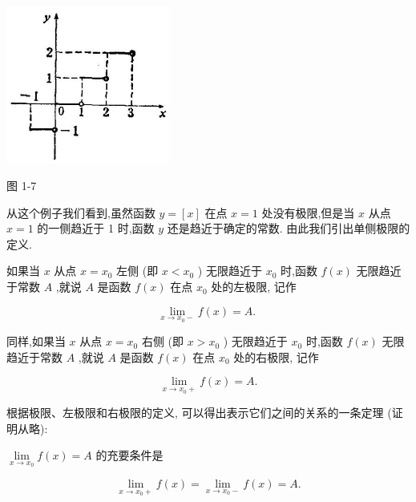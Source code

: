 \documentclass[lang=cn,newtx,10pt,scheme=chinese]{elegantbook}
\begin{document}
\begin{center}
	\includegraphics[max width=0.4\textwidth]{images/01912c18-5c3f-733d-b775-749ba9897a9d_25_214056.jpg}
\end{center}

图 1-7

从这个例子我们看到,虽然函数 \(y = \left\lbrack x\right\rbrack\) 在点 \(x = 1\) 处没有极限,但是当 \(x\) 从点 \(x = 1\) 的一侧趋近于 1 时,函数 \(y\) 还是趋近于确定的常数. 由此我们引出单侧极限的定义.

\begin{definition}[单侧极限] 

如果当 \(x\) 从点 \(x = {x}_{0}\) 左侧 (即 \(x < {x}_{0}\) ) 无限趋近于 \({x}_{0}\) 时,函数 \(f\left( x\right)\) 无限趋近于常数 \(A\) ,就说 \(A\) 是函数 \(f\left( x\right)\) 在点 \({x}_{0}\) 处的左极限, 记作

\[
\mathop{\lim }\limits_{{x \rightarrow {x}_{0} - }}f\left( x\right) = A\text{. }
\]

同样,如果当 \(x\) 从点 \(x = {x}_{0}\) 右侧 (即 \(x > {x}_{0}\) ) 无限趋近于 \({x}_{0}\) 时,函数 \(f\left( x\right)\) 无限趋近于常数 \(A\) ,就说 \(A\) 是函数 \(f\left( x\right)\) 在点 \({x}_{0}\) 处的右极限, 记作

\[
\mathop{\lim }\limits_{{x \rightarrow {x}_{0} + }}f\left( x\right) = A.
\]

\end{definition}

根据极限、左极限和右极限的定义, 可以得出表示它们之间的关系的一条定理 (证明从略):
\begin{theorem}[定理] 

\(\mathop{\lim }\limits_{{x \rightarrow {x}_{0}}}f\left( x\right) = A\) 的充要条件是

\[
\mathop{\lim }\limits_{{x \rightarrow {x}_{0} + }}f\left( x\right) = \mathop{\lim }\limits_{{x \rightarrow {x}_{0} - }}f\left( x\right) = A.
\]

\end{theorem}
\end{document}
